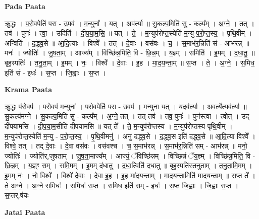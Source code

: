 \documentclass[17pt]{extarticle}
\begin{document}
\textbf{Pada Paata} \newline

क्रु॒द्धः । प॒रो॒वपेति॑ परा - उ॒पव॑ । म॒न्युना᳚ । यत् । अव॑र्त्या ॥ सु॒कल्प॒मिति॑ सु - कल्प᳚म् । अ॒ग्ने॒ । तत् । तव॑ । पुनः॑ । त्वा॒ । उदिति॑ । दी॒प॒या॒म॒सि॒ ॥ यत् । ते॒ । म॒न्युप॑रोप्त॒स्येति॑ म॒न्यु-प॒रो॒प्त॒स्य॒ । पृ॒थि॒वीम् । अन्विति॑ । द॒द्ध्व॒से ॥ आ॒दि॒त्याः । विश्वे᳚ । तत् । दे॒वाः । वस॑वः । च॒ । स॒माभ॑र॒न्निति॑ सं - आभ॑रन्न् ॥ मनः॑ । ज्योतिः॑ । जु॒ष॒ता॒म् । आज्य᳚म् । विच्छि॑न्न॒मिति॒ वि - छि॒न्न॒म् । य॒ज्ञ्म् । समिति॑ । इ॒मम् । द॒धा॒तु॒ ॥ बृह॒स्पतिः॑ । त॒नु॒ता॒म् । इ॒मम् । नः॒ । विश्वे᳚ । दे॒वाः । इ॒ह । मा॒द॒य॒न्ता॒म् ॥ स॒प्त । ते॒ । अ॒ग्ने॒ । स॒मिध॒ इति॑ सं - इधः॑ । स॒प्त । जि॒ह्वाः । स॒प्त ।  \newline


\textbf{Krama Paata} \newline

क्रु॒द्धः प॑रो॒वप॑ । प॒रो॒वप॑ म॒न्युना᳚ । प॒रो॒वपेति॑ परा - उ॒वप॑ । म॒न्युना॒ यत् । यदव॑र्त्या । अव॒र्त्येत्यव॑र्त्या ॥ सु॒कल्प॑मग्ने । सु॒कल्प॒मिति॑ सु - कल्प᳚म् । अ॒ग्ने॒ तत् । तत् तव॑ । तव॒ पुनः॑ । पुन॑स्त्वा । त्वोत् । उद् दी॑पयामसि । दी॒प॒या॒म॒सीति॑ दीपयामसि ॥ यत् ते᳚ । ते॒ म॒न्युप॑रोप्तस्य । म॒न्युप॑रोप्तस्य पृथि॒वीम् । म॒न्युप॑रोप्त॒स्येति॑ म॒न्यु - प॒रो॒प्त॒स्य॒ । पृ॒थि॒वीमनु॑ । अनु॑ दद्ध्व॒से । द॒द्ध्व॒स इति॑ दद्ध्व॒से ॥ आ॒दि॒त्या विश्वे᳚ । विश्वे॒ तत् । तद् दे॒वाः । दे॒वा वस॑वः । वस॑वश्च । च॒ स॒माभ॑रन्न् । स॒माभ॑र॒न्निति॑ सम् - आभ॑रन्न् ॥ मनो॒ ज्योतिः॑ । ज्योति॑र्,जुषताम् । जु॒ष॒ता॒माज्य᳚म् । आज्यं॒ ॅविच्छि॑न्नम् । विच्छि॑न्नं ॅय॒ज्ञ्म् । विच्छि॑न्न॒मिति॒ वि - छि॒न्न॒म् । य॒ज्ञ्ꣳ सम् । समि॒मम् । इ॒मम् द॑धातु । द॒धा॒त्विति॑ दधातु ॥ बृह॒स्पति॑स्तनुताम् । त॒नु॒ता॒मि॒मम् । इ॒मम् नः॑ । नो॒ विश्वे᳚ । विश्वे॑ दे॒वाः । दे॒वा इ॒ह । इ॒ह मा॑दयन्ताम् । मा॒द॒य॒न्ता॒मिति॑ मादयन्ताम् ॥ स॒प्त ते᳚ । ते॒ अ॒ग्ने॒ । अ॒ग्ने॒ स॒मिधः॑ । स॒मिधः॑ स॒प्त । स॒मिध॒ इति॑ सम् - इधः॑ । स॒प्त जि॒ह्वाः । जि॒ह्वाः स॒प्त । स॒प्तर्.ष॑यः \newline

\textbf{Jatai Paata} \newline
\end{document}
